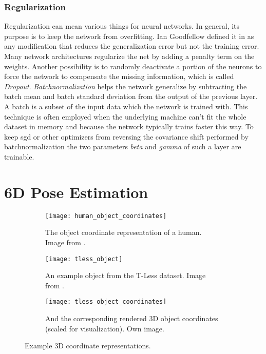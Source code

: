 \subsubsection{Regularization} Regularization can mean various things for neural networks. In general, its purpose is to keep the network from overfitting. Ian Goodfellow defined it in \cite{goodfellow} as any modification that reduces the generalization error but not the training error. Many network architectures regularize the net by adding a penalty term on the weights. Another possibility is to randomly deactivate a portion of the neurons to force the network to compensate the missing information, which is called \textit{Dropout}. \textit{Batchnormalization} helps the network generalize by subtracting the batch mean and batch standard deviation from the output of the previous layer. A batch is a subset of the input data which the network is trained with. This technique is often employed when the underlying machine can't fit the whole dataset in memory and because the network typically trains faster this way. To keep \gls{sgd} or other optimizers from reversing the covariance shift performed by batchnormalization the two parameters \textit{beta} and \textit{gamma} of such a layer are trainable.

\section{6D Pose Estimation}

\begin{figure}[!tbp]
	\centering
	\begin{subfigure}[t]{0.3\textwidth}
		\centering
    	\texttt{[image: human\_object\_coordinates]}
    	\caption{The object coordinate representation of a human. Image from \cite{tsharp}.}
    	\label{fig:human_object_coordinates}
	\end{subfigure}
	\begin{subfigure}[t]{0.3\textwidth}
		\centering
    	\texttt{[image: tless\_object]}
    	\caption{An example object from the T-Less dataset. Image from \cite{tless}.}
    	\label{fig:tless_object}
	\end{subfigure}
	\begin{subfigure}[t]{0.3\textwidth}
		\centering
    	\texttt{[image: tless\_object\_coordinates]}
    	\caption{And the corresponding rendered 3D object coordinates (scaled for visualization). Own image.}
    	\label{fig:tless_object_coordinates}
	\end{subfigure}
	\caption{Example 3D coordinate representations.}
\end{figure} 

